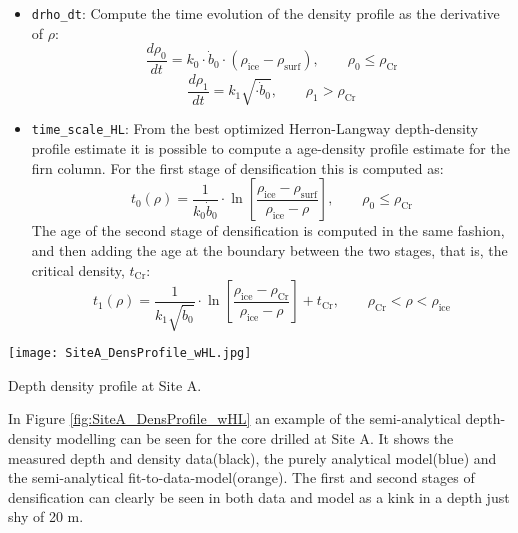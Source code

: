 \documentclass[../../CompleteThesis/Complete_1stDraft.tex]{subfiles}
\begin{document}
\begin{itemize}
	\item \lstinline[columns=fixed]|drho_dt|: Compute the time evolution of the density profile as the derivative of $\rho$:
	\begin{equation}
		\frac{d\rho_0}{dt} = k_0 \cdot\dot{b}_0\cdot (\rho_{\text{ice}} - \rho_{\text{surf}}), \qquad \rho_0 \leq \rho_{\text{Cr}}
	\end{equation}
	\begin{equation}
		\frac{d\rho_1}{dt} = k_1 \sqrt{\cdot\dot{b}_0}, \qquad \rho_1 > \rho_{\text{Cr}}
	\end{equation}	
	\item \lstinline[columns=fixed]|time_scale_HL|: From the best optimized Herron-Langway depth-density profile estimate it is possible to compute a age-density profile estimate for the firn column. For the first stage of densification this is computed as:
	\begin{equation}
		t_0(\rho) = \frac{1}{k_0 \dot{b}_0} \cdot \ln\left[\frac{\rho_{\text{ice}} - \rho_{\text{surf}}}{\rho_{\text{ice}} - \rho}\right], \qquad \rho_0 \leq \rho_{\text{Cr}}
	\end{equation}
	The age of the second stage of densification is computed in the same fashion, and then adding the age at the boundary between the two stages, that is, the critical density, $t_{\text{Cr}}$:
	\begin{equation}
		t_1(\rho) = \frac{1}{k_1 \sqrt{\dot{b}_0}}\cdot\ln\left[\frac{\rho_{\text{ice}} - \rho_{\text{Cr}}}{\rho_{\text{ice}} - \rho}\right] + t_{\text{Cr}}, \qquad \rho_{\text{Cr}} < \rho < \rho_{\text{ice}}
	\end{equation}
\end{itemize}

\begin{marginfigure}
	\centering
	\texttt{[image: SiteA\_DensProfile\_wHL.jpg]}
	\caption[Herron Langway density profile Site A]{\footnotesize{Depth density profile at Site A.}}%
	\label{fig:SiteA_DensProfile_wHL}
\end{marginfigure}
In Figure \ref{fig:SiteA_DensProfile_wHL} an example of the semi-analytical depth-density modelling can be seen for the core drilled at Site A. It shows the measured depth and density data(black), the purely analytical model(blue) and the semi-analytical fit-to-data-model(orange). The first and second stages of densification can clearly be seen in both data and model as a kink in a depth just shy of 20 m.
\end{document}
